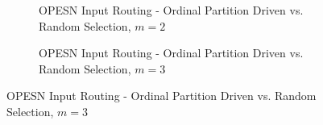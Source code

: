 \begin{figure}
    \centering

    \begin{subfigure}[t]{\textwidth}
        \caption{OPESN Input Routing - Ordinal Partition Driven vs. Random Selection, $m=2$}
        \label{fig:OPESN_routing_recursive_m_2}
        \centering
    \end{subfigure}

    \vspace{0em}

    \begin{subfigure}[t]{\textwidth}
        \caption{OPESN Input Routing - Ordinal Partition Driven vs. Random Selection, $m=3$}
        \label{fig:OPESN_routing_recursive_m_3}
        \centering
    \end{subfigure}

    \vspace{0em}


\end{figure}
